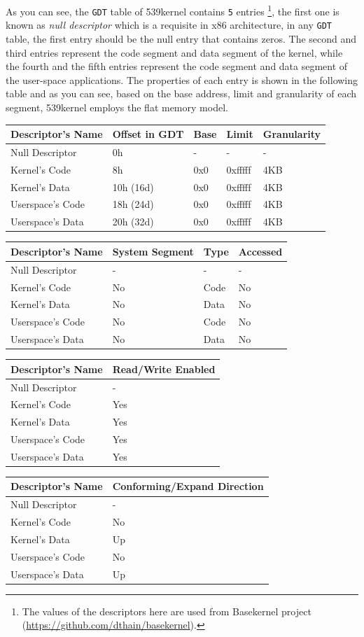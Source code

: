 As you can see, the \lstinline!GDT! table of 539kernel contains
\lstinline!5! entries \footnote{The values of the descriptors here are
  used from Basekernel project
  (\url{https://github.com/dthain/basekernel}).}, the first one is known
as \emph{null descriptor} which is a requisite in x86 architecture, in
any \lstinline!GDT! table, the first entry should be the null entry that
contains zeros. The second and third entries represent the code segment
and data segment of the kernel, while the fourth and the fifth entries
represent the code segment and data segment of the user-space
applications. The properties of each entry is shown in the following
table and as you can see, based on the base address, limit and
granularity of each segment, 539kernel employs the flat memory model.

\begin{longtable}[]{@{}lllll@{}}
\toprule
Descriptor's Name & Offset in GDT & Base & Limit &
Granularity\tabularnewline
\midrule
\endhead
Null Descriptor & 0h & - & - & -\tabularnewline
Kernel's Code & 8h & 0x0 & 0xfffff & 4KB\tabularnewline
Kernel's Data & 10h (16d) & 0x0 & 0xfffff & 4KB\tabularnewline
Userspace's Code & 18h (24d) & 0x0 & 0xfffff & 4KB\tabularnewline
Userspace's Data & 20h (32d) & 0x0 & 0xfffff & 4KB\tabularnewline
\bottomrule
\end{longtable}

\begin{longtable}[]{@{}llll@{}}
\toprule
Descriptor's Name & System Segment & Type & Accessed\tabularnewline
\midrule
\endhead
Null Descriptor & - & - & -\tabularnewline
Kernel's Code & No & Code & No\tabularnewline
Kernel's Data & No & Data & No\tabularnewline
Userspace's Code & No & Code & No\tabularnewline
Userspace's Data & No & Data & No\tabularnewline
\bottomrule
\end{longtable}

\begin{longtable}[]{@{}ll@{}}
\toprule
Descriptor's Name & Read/Write Enabled\tabularnewline
\midrule
\endhead
Null Descriptor & -\tabularnewline
Kernel's Code & Yes\tabularnewline
Kernel's Data & Yes\tabularnewline
Userspace's Code & Yes\tabularnewline
Userspace's Data & Yes\tabularnewline
\bottomrule
\end{longtable}

\begin{longtable}[]{@{}ll@{}}
\toprule
Descriptor's Name & Conforming/Expand Direction\tabularnewline
\midrule
\endhead
Null Descriptor & -\tabularnewline
Kernel's Code & No\tabularnewline
Kernel's Data & Up\tabularnewline
Userspace's Code & No\tabularnewline
Userspace's Data & Up\tabularnewline
\bottomrule
\end{longtable}

